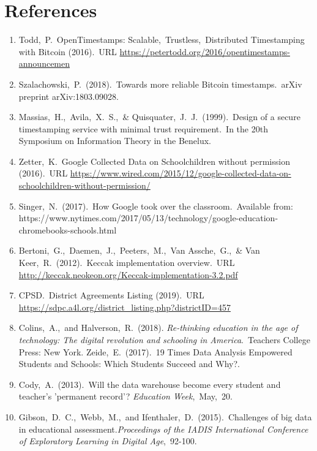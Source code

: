 \documentclass{article}
\begin{document}
\section{References}
\begin{enumerate}
    \label{sec:1}
    \item Todd,\ P.\ OpenTimestamps: Scalable,\ Trustless,\ Distributed Timestamping with Bitcoin (2016).\ URL \url{https://petertodd.org/2016/opentimestamps-announcemen}
    \label{sec:2}
    \item Szalachowski,\ P.\ (2018).\ Towards more reliable Bitcoin timestamps.\ arXiv preprint arXiv:1803.09028.
    \label{sec:3}
    \item Massias,\ H.,\ Avila,\ X.\ S.,\ \& Quisquater,\ J.\ J.\ (1999).\ Design of a secure timestamping service with minimal trust requirement.\ In the 20th Symposium on Information Theory in the Benelux.
    \label{sec:4}
    \item Zetter,\ K.\ Google Collected Data on Schoolchildren without permission (2016).\ URL \url{https://www.wired.com/2015/12/google-collected-data-on-schoolchildren-without-permission/}
    \label{sec:5}
    \item Singer,\ N.\ (2017).\ How Google took over the classroom.\ Available from: https://www.nytimes.com/2017/05/13/technology/google-education-chromebooks-schools.html
    \label{sec:6}
    \item Bertoni,\ G.,\ Daemen,\ J.,\ Peeters,\ M.,\ Van Assche,\ G.,\ \& Van Keer,\ R.\ (2012).\ Keccak implementation overview.\ URL  \url{http://keccak.neokeon.org/Keccak-implementation-3.2.pdf}
    \label{sec:7}
    \item CPSD.\ District Agreements Listing (2019).\ URL  \url{https://sdpc.a4l.org/district_listing.php?districtID=457}
    \label{sec:8}
    \item Colins,\ A.,\ and Halverson,\ R.\ (2018).\textit{ Re-thinking education in the age of technology: The digital revolution and schooling in America}.\ Teachers College Press: New York.
    \label{sec:9}
    Zeide,\ E.\ (2017).\ 19 Times Data Analysis Empowered Students and Schools: Which Students Succeed and Why?.
    \label{sec:10}
    \item Cody,\ A.\ (2013).\ Will the data warehouse become every student and teacher's 'permanent record'? \textit{Education Week},\ May,\ 20.
    \label{sec:11}
    \item Gibson,\ D.\ C.,\ Webb,\ M.,\ and Ifenthaler,\ D.\ (2015).\ Challenges of big data in educational assessment.\textit{Proceedings of the IADIS International Conference of Exploratory Learning in Digital Age},\ 92-100.

\end{enumerate}
\end{document}

